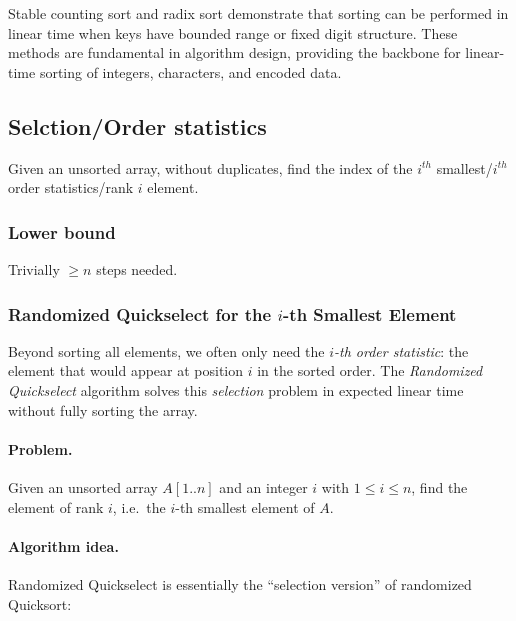 \documentclass[9pt]{extarticle}
\begin{document}
Stable counting sort and radix sort demonstrate that sorting can be performed in 
linear time when keys have bounded range or fixed digit structure.  
These methods are fundamental in algorithm design, providing the backbone for
linear-time sorting of integers, characters, and encoded data.

\subsection{Selction/Order statistics}
Given an unsorted array, without duplicates, find the index of the $i^{th}$ smallest/$i^{th}$ order statistics/rank $i$ element.
\subsubsection*{Lower bound}
Trivially $\geq n$ steps needed.
\subsubsection{Randomized Quickselect for the \(i\)-th Smallest Element}

Beyond sorting all elements, we often only need the \emph{\(i\)-th order statistic}:
the element that would appear at position \(i\) in the sorted order.  The
\emph{Randomized Quickselect} algorithm solves this \emph{selection} problem in
expected linear time without fully sorting the array.

\paragraph{Problem.}
Given an unsorted array \(A[1..n]\) and an integer \(i\) with \(1 \le i \le n\),
find the element of rank \(i\), i.e.\ the \(i\)-th smallest element of \(A\).

\paragraph{Algorithm idea.}
Randomized Quickselect is essentially the ``selection version'' of randomized
Quicksort:
\end{document}
